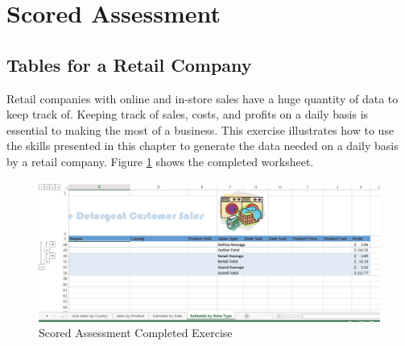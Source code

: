\begin{enumbox}
\begin{enumerate}
	\end{enumerate}
\end{enumbox}
	
\section{Scored Assessment}

\subsection{Tables for a Retail Company}

Retail companies with online and in-store sales have a huge quantity of data to keep track of. Keeping track of sales, costs, and profits on a daily basis is essential to making the most of a business. This exercise illustrates how to use the skills presented in this chapter to generate the data needed on a daily basis by a retail company. Figure \ref{05:fig31} shows the completed worksheet.

\begin{figure}[H]
	\centering
	\includegraphics[width=\maxwidth{.95\linewidth}]{gfx/ch05_fig31}
	\caption{Scored Assessment Completed Exercise}
	\label{05:fig31}
\end{figure}

